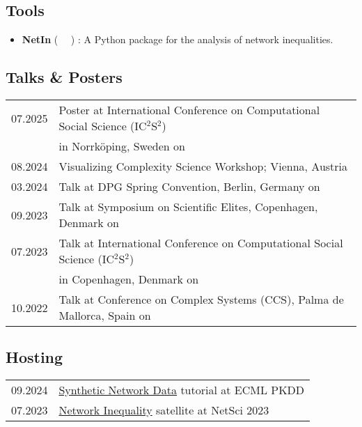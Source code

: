 \documentclass[11pt]{article} %
\begin{document}
\subsection*{Tools}
%
\begin{itemize}
    \item \textbf{NetIn} (~\href{https://pypi.org/project/netin/}{\faPython}
        \hspace{0.5em}\href{https://github.com/CSHVienna/NetworkInequalities}{\faGithub}
        \hspace{0.5em}\href{https://cshvienna.github.io/NetworkInequalities/}{\faFile*[regular]}~)
        : A Python package for the analysis of network inequalities.

\end{itemize}

\subsection*{Talks \& Posters}
\begin{longtable}[l]{@{}p{} p{}}
  07.2025     & Poster at International Conference on Computational Social Science (IC$^2$S$^2$)\\
              & in Norrk\"oping, Sweden on~\cite{bachmann.etal_patch_2025}\\
  08.2024     & Visualizing Complexity Science Workshop; Vienna, Austria\\
  03.2024     & Talk at DPG Spring Convention, Berlin, Germany on~\cite{bachmann.etal_cumulativeadvantagebrokerage_2024}\\
  09.2023     & Talk at Symposium on Scientific Elites, Copenhagen, Denmark on~\cite{bachmann.etal_cumulativeadvantagebrokerage_2024}\\
  07.2023     & Talk at International Conference on Computational Social Science (IC$^2$S$^2$)\\
              & in Copenhagen, Denmark on~\cite{bachmann.etal_cumulativeadvantagebrokerage_2024}\\
  10.2022     & Talk at Conference on Complex Systems (CCS), Palma de Mallorca, Spain on~\cite{bachmann.etal_cumulativeadvantagebrokerage_2024}
\end{longtable}

\subsection*{Hosting}
\label{organizing}
\begin{longtable}[l]{@{}p{} p{}}
  09.2024     & \href{https://sites.google.com/view/snma-tutorial/2024}{Synthetic Network Data} tutorial at ECML PKDD\\
  07.2023     & \href{https://sites.google.com/view/netin-satellite-2023/home}{Network Inequality} satellite at NetSci 2023\\
\end{longtable}
\end{document}
